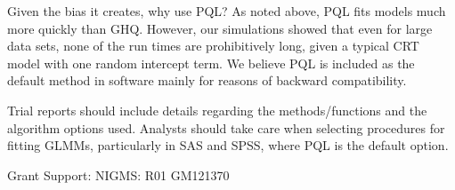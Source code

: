 \documentclass[Afour,times,sagev,doublespace]{sagej}
\begin{document}
Given the bias it creates, why use PQL? As noted above, PQL fits models much more quickly than GHQ. However, our simulations showed that even for large data sets, none of the run times are prohibitively long, given a typical CRT model with one random intercept term. We believe PQL is included as the default method in software mainly for reasons of backward compatibility.

Trial reports should include details regarding the methods/functions and the algorithm options used.  Analysts should take care when selecting procedures for fitting GLMMs, particularly in SAS and SPSS, where PQL is the default option.





\begin{funding}
Grant Support: NIGMS: R01 GM121370
\end{funding}
\end{document}
